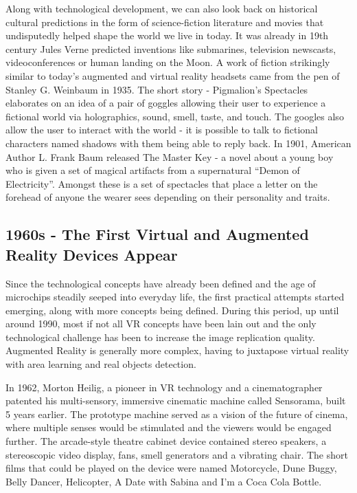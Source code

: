 \documentclass[12pt, a4paper]{article}
\begin{document}

Along with technological development, we can also look back on historical cultural predictions in the form of science-fiction literature and movies that undisputedly helped shape the world we live in today. It was already in 19th century Jules Verne predicted inventions like submarines, television newscasts, videoconferences or human landing on the Moon. A work of fiction strikingly similar to today’s augmented and virtual reality headsets came from the pen of  Stanley G. Weinbaum in 1935. The short story - Pigmalion’s Spectacles elaborates on an idea of a pair of goggles allowing their user to experience a fictional world via holographics, sound, smell, taste, and touch. The googles also allow the user to interact with the world - it is possible to talk to fictional characters named shadows with them being able to reply back. In 1901, American Author L. Frank Baum released The Master Key - a novel about a young boy who is given a set of magical artifacts from a supernatural “Demon of Electricity”. Amongst these is a set of spectacles that place a letter on the forehead of anyone the wearer sees depending on their personality and traits.

\subsection{1960s - The First Virtual and Augmented Reality Devices Appear}
Since the technological concepts have already been defined and the age of microchips steadily seeped into everyday life, the first practical attempts started emerging, along with more concepts being defined. During this period, up until around 1990, most if not all VR concepts have been lain out and the only technological challenge has been to increase the image replication quality. Augmented Reality is generally more complex, having to juxtapose virtual reality with area learning and real objects detection.

In 1962, Morton Heilig, a pioneer in VR technology and a cinematographer patented his multi-sensory, immersive cinematic machine called Sensorama, built 5 years earlier. The prototype machine served as a vision of the future of cinema, where multiple senses would be stimulated and the viewers would be engaged further. The arcade-style theatre cabinet device contained stereo speakers, a stereoscopic video display, fans, smell generators and a vibrating chair. The short films that could be played on the device were named Motorcycle, Dune Buggy, Belly Dancer, Helicopter, A Date with Sabina and I’m a Coca Cola Bottle.
\end{document}
